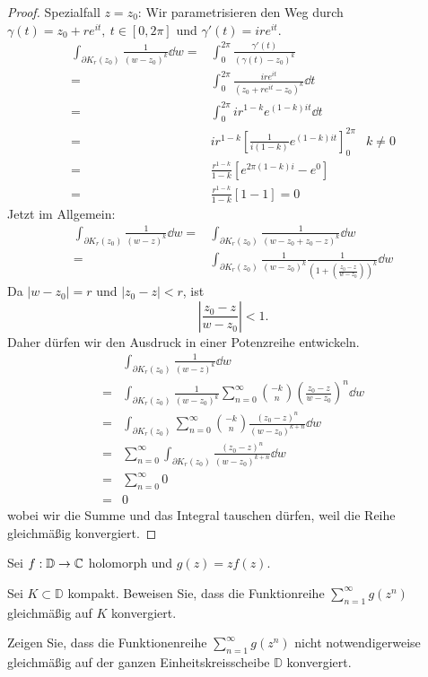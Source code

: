 \begin{proof}
	Spezialfall $z=z_0$: Wir parametrisieren den Weg durch $\gamma(t)= z_0+ re^{it},~t\in [0,2\pi]$ und $\gamma'(t) = i re^{it}$. 
\begin{align*}
	\int_{\partial K_r(z_0)} \frac{1}{(w-z_0)^k}\dd{w}=& \int_0^{2\pi} \frac{\gamma'(t)}{(\gamma(t)-z_0)^k}\\
	=&\int_0^{2\pi} \frac{i re^{it}}{(z_0+re^{it}-z_0)^k}\dd{t}\\
	=&\int_0^{2\pi} i r^{1-k} e^{(1-k)it}\dd{t}\\
	=&i r^{1-k} \left[ \frac{1}{i(1-k)}e^{(1-k)it} \right]_0^{2\pi} & k\neq 0\\
	=& \frac{r^{1-k}}{1-k}\left[ e^{2\pi(1-k)i} - e^{0} \right] \\
	=& \frac{r^{1-k}}{1-k}\left[ 1- 1\right] =0
\end{align*}
Jetzt im Allgemein:
\begin{align*}
	\int_{\partial K_r(z_0)}\frac{1}{(w-z)^k}\dd{w}=&\int_{\partial K_r(z_0)}\frac{1}{(w-z_0+z_0-z)^k}\dd{w}\\
	=&\int_{\partial K_r(z_0)}\frac{1}{(w-z_0)^k}\frac{1}{\left( 1+\left( \frac{z_0-z}{w-z_0} \right) \right)^k}\dd{w}
\end{align*}
Da $|w-z_0|=r$ und $|z_0-z|<r$, ist
\[
 \left|\frac{z_0-z}{w-z_0} \right| <1
.\]
Daher dürfen wir den Ausdruck in einer Potenzreihe entwickeln.
\begin{align*}
&	\int_{\partial K_r(z_0)} \frac{1}{(w-z)^k}\dd{w}
\\=&\int_{\partial K_r(z_0)}\frac{1}{(w-z_0)^k}\sum_{n=0}^\infty \binom{-k}{n}\left( \frac{z_0-z}{w-z_0} \right)^n\dd{w}\\
=&\int_{\partial K_r(z_0)}\sum_{n=0}^\infty \binom{-k}{n} \frac{(z_0-z)^n}{(w-z_0)^{k+n}}\dd{w}\\
=&\sum_{n=0}^\infty \int_{\partial K_r(z_0)} \frac{(z_0-z)^n}{(w-z_0)^{k+n}}\dd{w}\\
=& \sum_{n=0}^\infty 0\\
=&0
\end{align*}
wobei wir die Summe und das Integral tauschen dürfen, weil die Reihe gleichmäßig konvergiert.
\end{proof}

\begin{Problem}
	Sei $f:\mathbb{D}\to \mathbb{C}$ holomorph und $g(z)=zf(z)$.
	\begin{parts}
	\item Sei $K\subset \mathbb{D}$ kompakt. Beweisen Sie, dass die Funktionreihe $\sum_{n=1}^\infty g(z^n)$ gleichmäßig auf $K$ konvergiert.
	\item Zeigen Sie, dass die Funktionenreihe $\sum_{n=1}^\infty g(z^n)$ nicht notwendigerweise gleichmäßig auf der ganzen Einheitskreisscheibe $\mathbb{D}$ konvergiert.
	\end{parts}
\end{Problem}
